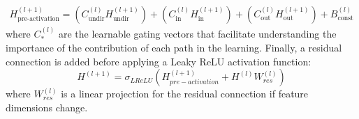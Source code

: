 \documentclass[utf8]{article}
\begin{document}
	\begin{multline}
		H_{\text{pre-activation}}^{(l+1)} = \left( C_{\text{undir}}^{(l)} H_{\text{undir}}^{(l+1)} \right) + \left( C_{\text{in}}^{(l)} H_{\text{in}}^{(l+1)} \right)
		+ \left( C_{\text{out}}^{(l)} H_{\text{out}}^{(l+1)} \right) + B_{\text{const}}^{(l)}
	\end{multline}
	where $C_*^{(l)}$ are the learnable gating vectors that facilitate understanding the importance of the contribution of each path in the learning. Finally, a residual connection is added before applying a Leaky ReLU activation function:
	\begin{equation}
		H^{(l+1)} = \sigma_{LReLU}\left(H_{pre-activation}^{(l+1)} + H^{(l)}W_{res}^{(l)}\right)
	\end{equation}
	where $W_{res}^{(l)}$ is a linear projection for the residual connection if feature dimensions change.
	
\end{document}
